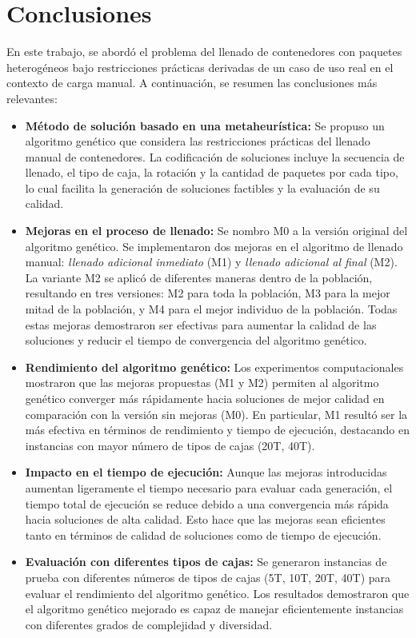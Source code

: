 \section{Conclusiones}

En este trabajo, se abordó el problema del llenado de contenedores con paquetes heterogéneos bajo restricciones prácticas derivadas de un caso de uso real en el contexto de carga manual. A continuación, se resumen las conclusiones más relevantes:

\begin{itemize}
    \item \textbf{Método de solución basado en una metaheurística:} Se propuso un algoritmo genético que considera las restricciones prácticas del llenado manual de contenedores. La codificación de soluciones incluye la secuencia de llenado, el tipo de caja, la rotación y la cantidad de paquetes por cada tipo, lo cual facilita la generación de soluciones factibles y la evaluación de su calidad.
    \item \textbf{Mejoras en el proceso de llenado:} Se nombro M0 a la versión original del algoritmo genético. Se implementaron dos mejoras en el algoritmo de llenado manual: \textit{llenado adicional inmediato} (M1) y \textit{llenado adicional al final} (M2). La variante M2 se aplicó de diferentes maneras dentro de la población, resultando en tres versiones: M2 para toda la población, M3 para la mejor mitad de la población, y M4 para el mejor individuo de la población. Todas estas mejoras demostraron ser efectivas para aumentar la calidad de las soluciones y reducir el tiempo de convergencia del algoritmo genético.

    \item \textbf{Rendimiento del algoritmo genético:} Los experimentos computacionales mostraron que las mejoras propuestas (M1 y M2) permiten al algoritmo genético converger más rápidamente hacia soluciones de mejor calidad en comparación con la versión sin mejoras (M0). En particular, M1 resultó ser la más efectiva en términos de rendimiento y tiempo de ejecución, destacando en instancias con mayor número de tipos de cajas (20T, 40T).

    \item \textbf{Impacto en el tiempo de ejecución:} Aunque las mejoras introducidas aumentan ligeramente el tiempo necesario para evaluar cada generación, el tiempo total de ejecución se reduce debido a una convergencia más rápida hacia soluciones de alta calidad. Esto hace que las mejoras sean eficientes tanto en términos de calidad de soluciones como de tiempo de ejecución.

    \item \textbf{Evaluación con diferentes tipos de cajas:} Se generaron instancias de prueba con diferentes números de tipos de cajas (5T, 10T, 20T, 40T) para evaluar el rendimiento del algoritmo genético. Los resultados demostraron que el algoritmo genético mejorado es capaz de manejar eficientemente instancias con diferentes grados de complejidad y diversidad.
\end{itemize}

